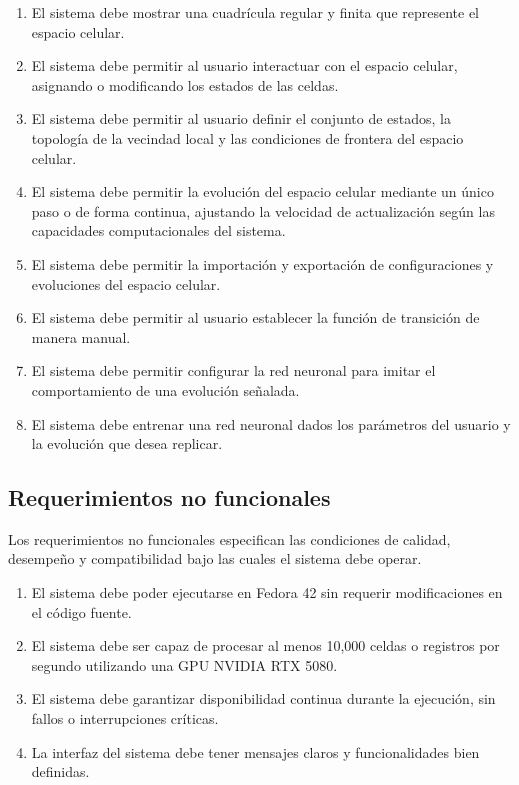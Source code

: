 \begin{enumerate}[label=RF\arabic*]
	
	\item El sistema debe mostrar una cuadrícula regular y finita que represente el espacio celular.
	
	\item El sistema debe permitir al usuario interactuar con el espacio celular, asignando o modificando los estados de las celdas.
	
	\item El sistema debe permitir al usuario definir el conjunto de estados, la topología de la vecindad local y las condiciones de frontera del espacio celular.
	
	\item El sistema debe permitir la evolución del espacio celular mediante un único paso o de forma continua, ajustando la velocidad de actualización según las capacidades computacionales del sistema.
	
	\item El sistema debe permitir la importación y exportación de configuraciones y evoluciones del espacio celular.
	
	\item El sistema debe permitir al usuario establecer la función de transición de manera manual.
	
	\item El sistema debe permitir configurar la red neuronal para imitar el comportamiento de una evolución señalada.
	
	\item El sistema debe entrenar una red neuronal dados los parámetros del usuario y la evolución que desea replicar.
	
\end{enumerate}

\subsection{Requerimientos no funcionales}

Los requerimientos no funcionales especifican las condiciones de calidad, desempeño y compatibilidad bajo las cuales el sistema debe operar.

\begin{enumerate}[label=RNF\arabic*.]
	
	\item El sistema debe poder ejecutarse en Fedora 42 sin requerir modificaciones en el código fuente.
	
	\item El sistema debe ser capaz de procesar al menos 10,000 celdas o registros por segundo utilizando una GPU NVIDIA RTX 5080.
	
	\item El sistema debe garantizar disponibilidad continua durante la ejecución, sin fallos o interrupciones críticas.
	
	\item La interfaz del sistema debe tener mensajes claros y funcionalidades bien definidas.
	
\end{enumerate}

